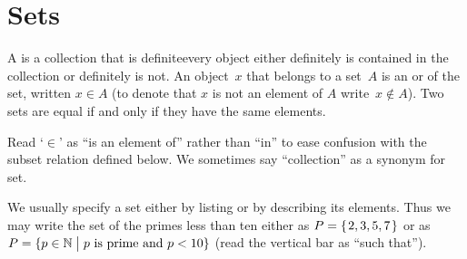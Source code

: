 \documentclass{test}  %
\begin{document}
\begin{problem}
\end{problem}










\chapter{Sets}
\begin{df}
A  is a collection that is definite\Dash every 
object either
definitely is contained in the collection or definitely is not.
An object~$x$ that belongs to a set~$A$ is an 
or 
of the set, written $x\in A$
(to denote that $x$ is not an element of $A$ write~$x\notin A$).
Two sets are equal if and only if they have the same elements.
\end{df}
\noindent Read `$\in$' as ``is an element of'' rather than ``in'' to ease
confusion with 
the subset relation defined below.
We sometimes say ``collection'' as a synonym for set.

We usually specify a set either by listing or by
describing its elements.
Thus we may write 
the set of the primes less than ten either 
as $P=\mbox{$\{\hspace{0.1em}2, 3, 5, 7\hspace{0.1em}\}$}$ 
or as~$P=\{p\in\mathbb{N} \bigm| \text{$p$ is prime and $p<10$}\}$ 
(read the vertical bar as ``such that'').
\end{document}
